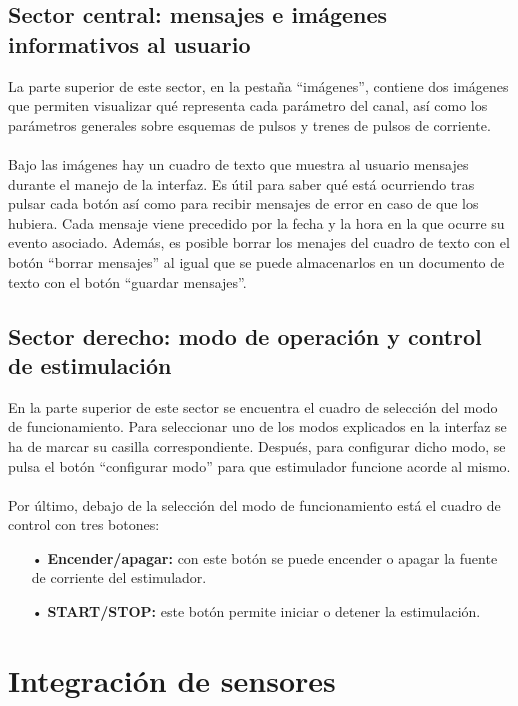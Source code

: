 \subsection{Sector central: mensajes e imágenes informativos al usuario}
La parte superior de este sector, en la pestaña ``imágenes'', contiene dos imágenes que permiten visualizar qué representa cada parámetro del canal, así como los parámetros generales sobre esquemas de pulsos y trenes de pulsos de corriente.
\\
\\
Bajo las imágenes hay un cuadro de texto que muestra al usuario mensajes durante el manejo de la interfaz. Es útil para saber qué está ocurriendo tras pulsar cada botón así como para recibir mensajes de error en caso de que los hubiera. Cada mensaje viene precedido por la fecha y la hora en la que ocurre su evento asociado. Además, es posible borrar los menajes del cuadro de texto con el botón ``borrar mensajes'' al igual que se puede almacenarlos en un documento de texto con el botón ``guardar mensajes''.

\subsection{Sector derecho: modo de operación y control de estimulación}
En la parte superior de este sector se encuentra el cuadro de selección del modo de funcionamiento. Para seleccionar uno de los modos explicados en la interfaz se ha de marcar su casilla correspondiente. Después, para configurar dicho modo, se pulsa el botón ``configurar modo'' para que estimulador funcione acorde al mismo.
\\
\\
Por último, debajo de la selección del modo de funcionamiento está el cuadro de control con tres botones:

\begin{itemize}
\item[•] \textbf{Encender/apagar:} con este botón se puede encender o apagar la fuente de corriente del estimulador.
\item[•] \textbf{START/STOP:} este botón permite iniciar o detener la estimulación.
\end{itemize}



\section{Integración de sensores}


